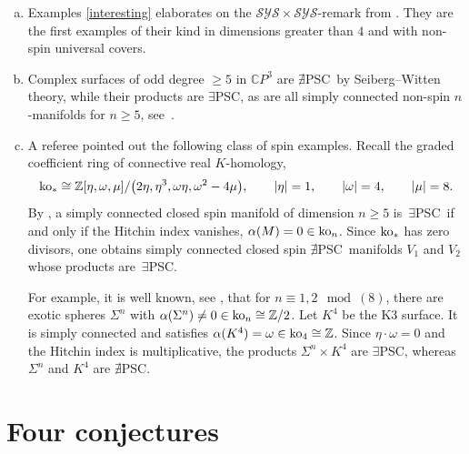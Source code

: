 \documentclass[pdftex]{sigma}
\numberwithin{equation}{section}
\newcommand{\Z}{\mathbb{Z}}
\newcommand{\no}{{\color{brown!70!black}$\nexists$}{\sf PSC}}
\newcommand{\yes}{{\color {blue!70!black}$\exists$}{\sf PSC}}
\begin{document}
\begin{Remark}\quad
\begin{enumerate}[(a)]\itemsep=0pt
\item Examples \ref{interesting} elaborates on the $\mathcal{SYS} \times \mathcal{SYS}$-remark from \cite{Gr2018}.
They are the first examples of their kind in dimensions greater than $4$ and with non-spin universal covers.
\item Complex surfaces of odd degree $\geq 5$ in $\mathbb{C}P^3$ are \no~by Seiberg--Witten theory, while their products are \yes, as are all simply connected non-spin $n$-manifolds for $n\geq 5$, see~\cite{GL}.
\item A referee pointed out the following class of spin examples.
Recall the graded coefficient ring of connective real $K$-homology,
\[
 {\rm ko}_* \cong \Z[ \eta, \omega, \mu] / \big( 2 \eta, \eta^3, \omega \eta, \omega^2 - 4 \mu\big), \qquad |\eta| = 1,\qquad |\omega| = 4,\qquad |\mu|=8.
\]
By \cite[Theorem A]{Stolz92}, a simply connected closed spin manifold of dimension $n \geq 5$ is~\yes~if and only if the Hitchin index \cite{Hitchin} vanishes, $\alpha(M) = 0 \in {\rm ko}_n$.
Since ${\rm ko}_*$ has zero divisors, one obtains simply connected closed spin \no~manifolds $V_1$ and $V_2$ whose products are~\yes.

For example, it is well known, see \cite[p.\ 44]{Hitchin}, that for $n \equiv 1, 2 \mod(8)$, there are exotic spheres $\Sigma^n$ with $\alpha(\Sigma^n) \neq 0 \in {\rm ko}_n \cong \Z/2$.
Let $K^4$ be the K3 surface.
It is simply connected and satisfies $\alpha(K^4) = \omega \in {\rm ko}_4 \cong \Z$.
Since $\eta \cdot \omega = 0$ and the Hitchin index is multiplicative, the products $\Sigma^n \times K^4$ are \yes, whereas $\Sigma^n$ and $K^4$ are \no.
\end{enumerate}
\end{Remark}

\section{Four conjectures} \label{fourconjectures}
\end{document}

